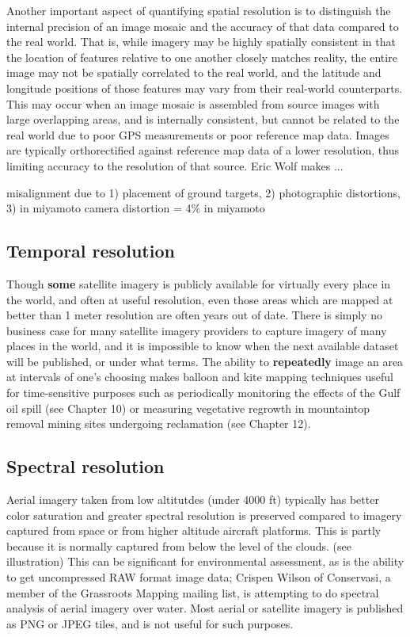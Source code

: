 \documentclass[11pt]{report}
\begin{document}
Another important aspect of quantifying spatial resolution is to distinguish the internal precision of an image mosaic and the accuracy of that data compared to the real world. That is, while imagery may be highly spatially consistent in that the location of features relative to one another closely matches reality, the entire image may not be spatially correlated to the real world, and the latitude and longitude positions of those features may vary from their real-world counterparts. This may occur when an image mosaic is assembled from source images with large overlapping areas, and is internally consistent, but cannot be related to the real world due to poor GPS measurements or poor reference map data. Images are typically orthorectified against reference map data of a lower resolution, thus limiting accuracy to the resolution of that source. Eric Wolf makes ...


misalignment due to 1) placement of ground targets, 2) photographic distortions, 3) in miyamoto
camera distortion = 4\% in miyamoto

\subsection{Temporal resolution}

Though \textbf{some} satellite imagery is publicly available for virtually every place in the world, and often at useful resolution, even those areas which are mapped at better than 1 meter resolution are often years out of date. There is simply no business case for many satellite imagery providers to capture imagery of many places in the world, and it is impossible to know when the next available dataset will be published, or under what terms. \cite{oconnor2008maps} The ability to \textbf{repeatedly} image an area at intervals of one's choosing makes balloon and kite mapping techniques useful for time-sensitive purposes such as periodically monitoring the effects of the Gulf oil spill (see Chapter 10) or measuring vegetative regrowth in mountaintop removal mining sites undergoing reclamation (see Chapter 12). 

\subsection{Spectral resolution}

Aerial imagery taken from low altitutdes (under 4000 ft) typically has better color saturation and greater spectral resolution is preserved compared to imagery captured from space or from higher altitude aircraft platforms. This is partly because it is normally captured from below the level of the clouds. (see illustration) This can be significant for environmental assessment, as is the ability to get uncompressed RAW format image data; Crispen Wilson of Conservasi, a  member of the Grassroots Mapping mailing list, is attempting to do spectral analysis of aerial imagery over water. Most aerial or satellite imagery is published as PNG or JPEG tiles, and is not useful for such purposes.  
\end{document}
